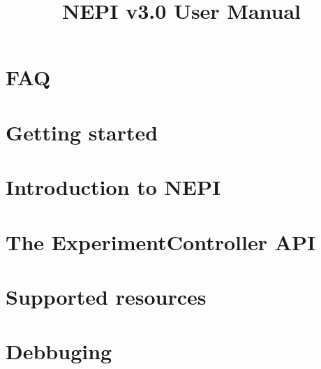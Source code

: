 \documentclass[12pt,openany]{memoir}
\title{NEPI v3.0 User Manual}
\date{}
\author{}
\begin{document}
\clearpage\maketitle
\thispagestyle{empty}

\pagebreak
\tableofcontents

\chapter{FAQ}
\label{faq}


\chapter{Getting started}
\label{getting_started}


\chapter{Introduction to NEPI}
\label{introduction}


\chapter{The ExperimentController API}
\label{ec_api}


\chapter{Supported resources}
\label{supported_resources}





\chapter{Debbuging}
\label{debugging}




\end{document}
